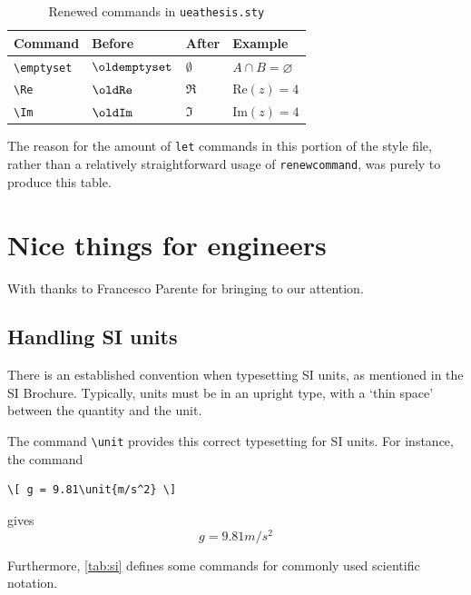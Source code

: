 \begin{table}[ht!]
\renewcommand{\arraystretch}{1.5}
\centering
\begin{tabular}{llll}
Command & Before & After & Example\\ \hline
\verb|\emptyset| & $\oldemptyset$ & $\emptyset$ & $A\cap B = \varnothing$\\
\verb|\Re| & $\oldRe$ & $\Re$ & $\mathrm{Re}(z) = 4$\\
\verb|\Im| & $\oldIm$ & $\Im$ & $\mathrm{Im}(z) = 4$
\end{tabular}
\caption{Renewed commands in \texttt{ueathesis.sty}}\label{tab:renew}
\end{table}

\begin{remark} The reason for the amount of \verb|let| commands in this portion of the style file, rather than a relatively straightforward usage of \verb|renewcommand|, was purely to produce this table.
\end{remark}

\section{Nice things for engineers}

With thanks to Francesco Parente for bringing \citep{beccari1997typesetting} to our attention.

\subsection{Handling SI units}

There is an established convention when typesetting SI units, as mentioned in the SI Brochure. Typically, units must be in an upright type, with a `thin space' between the quantity and the unit.

The command \verb|\unit| provides this correct typesetting for SI units. For instance, the command \begin{verbatim}\[ g = 9.81\unit{m/s^2} \]
\end{verbatim}
gives
\[ g = 9.81\unit{m/s^2} \]

Furthermore, \autoref{tab:si} defines some commands for commonly used scientific notation.

